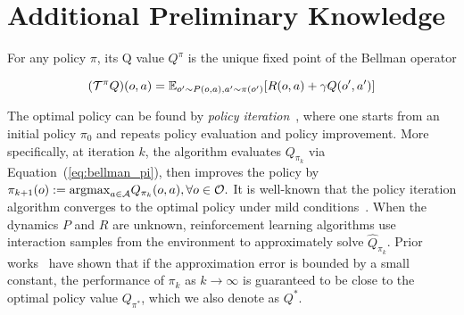 \section{Additional Preliminary Knowledge}
\label{app:prelim}


For any policy $\pi$, its Q value $Q^\pi$ is the unique fixed point of the Bellman operator

\begin{equation}
\label{eq:bellman_pi}
    (\mathcal{T}^\pi Q) (o,a) = \mathbb{E}_{o^\prime \sim P(o,a), a^\prime \sim \pi(o^\prime)}[R(o,a) + \gamma  Q(o^\prime, a^\prime)] 
\end{equation}  

The optimal policy can be found by \textit{policy iteration}~\citep{howard1960dynamic}, where one starts from an initial policy $\pi_0$ and repeats policy evaluation and policy improvement. More specifically, at iteration $k$, the algorithm evaluates $Q_{\pi_k}$ via Equation~(\ref{eq:bellman_pi}), then improves the policy by $\pi_{k+1}(o) := \mathrm{argmax}_{a\in\mathcal{A}} Q_{\pi_k}(o,a), \forall o \in\mathcal{O}.$
It is well-known that the policy iteration algorithm converges to the optimal policy under mild conditions~\citep{puterman2014markov}.
When the dynamics $P$ and $R$ are unknown, reinforcement learning algorithms use interaction samples from the environment to approximately solve $\hat{Q}_{\pi_k}$.
Prior works~\citep{BertsekasTsitsiklis96,munos2005error} have shown that if the approximation error is bounded by a small constant, the performance of $\pi_k$ as $k\to\infty$ is guaranteed to be close to the optimal policy value $Q_{\pi^*}$, which we also denote as $Q^*$.